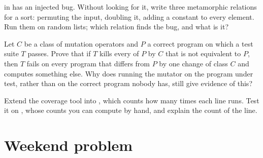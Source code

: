 \begin{exercise}[$\star\star\star$]\label{exo:b3:software-engineering:10}
 in  has an injected bug. Without looking for it, write three metamorphic relations for a sort: permuting the input, doubling it, adding a constant to every element. Run them on random lists; which relation finds the bug, and what is it?
\end{exercise}

\begin{exercise}[$\star\star\star$]\label{exo:b3:software-engineering:11}
Let $C$ be a class of mutation operators and $P$ a correct program on which a test suite $T$ passes. Prove that if $T$ kills every  of $P$ by $C$ that is not equivalent to $P$, then $T$ fails on every program that differs from $P$ by one change of class $C$ and computes something else. Why does running the mutator on the program under test, rather than on the correct program nobody has, still give evidence of this?
\end{exercise}

\begin{exercise}[$\star\star\star$]\label{exo:b3:software-engineering:12}
Extend the coverage tool into , which counts how many times each line runs. Test it on , whose counts you can compute by hand, and explain the count of the  line.
\end{exercise}

\section{Weekend problem}\label{sec:b3:software-engineering:problem}

